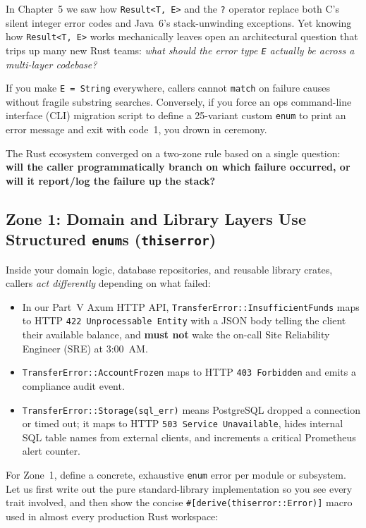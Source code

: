 In Chapter~5 we saw how \texttt{Result<T, E>} and the \texttt{?} operator replace both C's silent integer error codes and Java~6's stack-unwinding exceptions. Yet knowing how \texttt{Result<T, E>} works mechanically leaves open an architectural question that trips up many new Rust teams: \emph{what should the error type \texttt{E} actually be across a multi-layer codebase?}

If you make \texttt{E = String} everywhere, callers cannot \texttt{match} on failure causes without fragile substring searches. Conversely, if you force an ops command-line interface (CLI) migration script to define a 25-variant custom \texttt{enum} to print an error message and exit with code~1, you drown in ceremony.

The Rust ecosystem converged on a two-zone rule based on a single question: \textbf{will the caller programmatically branch on which failure occurred, or will it report/log the failure up the stack?}

\subsection{Zone 1: Domain and Library Layers Use Structured \texttt{enum}s (\texttt{thiserror})}

Inside your domain logic, database repositories, and reusable library crates, callers \emph{act differently} depending on what failed:
\begin{itemize}
  \item In our Part~V Axum HTTP API, \texttt{TransferError::InsufficientFunds} maps to HTTP \texttt{422 Unprocessable Entity} with a JSON body telling the client their available balance, and \textbf{must not} wake the on-call Site Reliability Engineer (SRE) at 3:00~AM.
  \item \texttt{TransferError::AccountFrozen} maps to HTTP \texttt{403 Forbidden} and emits a compliance audit event.
  \item \texttt{TransferError::Storage(sql\_err)} means PostgreSQL dropped a connection or timed out; it maps to HTTP \texttt{503 Service Unavailable}, hides internal SQL table names from external clients, and increments a critical Prometheus alert counter.
\end{itemize}

For Zone~1, define a concrete, exhaustive \texttt{enum} error per module or subsystem. Let us first write out the pure standard-library implementation so you see every trait involved, and then show the concise \texttt{\#[derive(thiserror::Error)]} macro used in almost every production Rust workspace:

